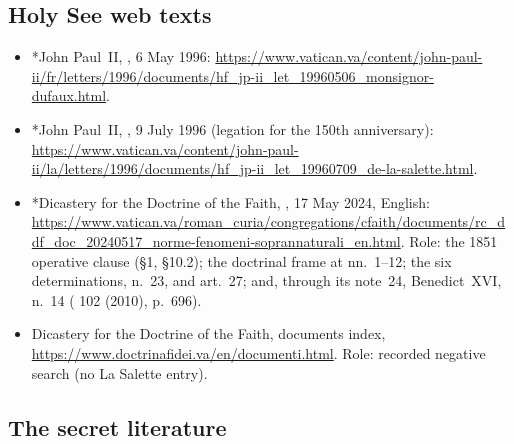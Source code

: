 \subsection*{Holy See web texts}

\begin{itemize}
\item *John Paul~II, , 6 May 1996:
\url{https://www.vatican.va/content/john-paul-ii/fr/letters/1996/documents/hf_jp-ii_let_19960506_monsignor-dufaux.html}.
\item *John Paul~II, , 9 July 1996 (legation for the 150th anniversary):
\url{https://www.vatican.va/content/john-paul-ii/la/letters/1996/documents/hf_jp-ii_let_19960709_de-la-salette.html}.
\item *Dicastery for the Doctrine of the Faith, , 17
May 2024, English:
\url{https://www.vatican.va/roman_curia/congregations/cfaith/documents/rc_ddf_doc_20240517_norme-fenomeni-soprannaturali_en.html}.
Role: the 1851 operative clause (\S1, \S10.2); the doctrinal frame at
nn.~1--12; the six determinations, n.~23, and art.~27; and, through
its note~24, Benedict~XVI,  n.~14 (
102 (2010), p.~696).
\item Dicastery for the Doctrine of the Faith, documents index,
\url{https://www.doctrinafidei.va/en/documenti.html}. Role: recorded
negative search (no La Salette entry).
\end{itemize}

\subsection*{The secret literature}

